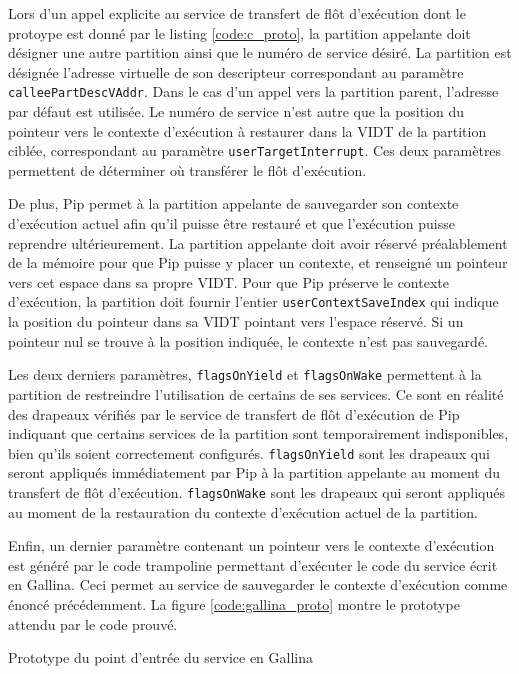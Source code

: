 	Lors d'un appel explicite au service de transfert de flôt d'exécution dont le protoype est donné par le listing \ref{code:c_proto}, la partition appelante doit désigner une autre partition ainsi que le numéro de service désiré. La partition est désignée l'adresse virtuelle de son descripteur correspondant au paramètre \texttt{calleePartDescVAddr}. Dans le cas d'un appel vers la partition parent, l'adresse par défaut est utilisée. Le numéro de service n'est autre que la position du pointeur vers le contexte d'exécution à restaurer dans la VIDT de la partition ciblée, correspondant au paramètre \texttt{userTargetInterrupt}. Ces deux paramètres permettent de déterminer où transférer le flôt d'exécution.

	De plus, Pip permet à la partition appelante de sauvegarder son contexte d'exécution actuel afin qu'il puisse être restauré et que l'exécution puisse reprendre ultérieurement. La partition appelante doit avoir réservé préalablement de la mémoire pour que Pip puisse y placer un contexte, et renseigné un pointeur vers cet espace dans sa propre VIDT. Pour que Pip préserve le contexte d'exécution, la partition doit fournir l'entier \texttt{userContextSaveIndex} qui indique la position du pointeur dans sa VIDT pointant vers l'espace réservé. Si un pointeur nul se trouve à la position indiquée, le contexte n'est pas sauvegardé.

	Les deux derniers paramètres, \texttt{flagsOnYield} et \texttt{flagsOnWake} permettent à la partition de restreindre l'utilisation de certains de ses services. Ce sont en réalité des drapeaux vérifiés par le service de transfert de flôt d'exécution de Pip indiquant que certains services de la partition sont temporairement indisponibles, bien qu'ils soient correctement configurés. \texttt{flagsOnYield} sont les drapeaux qui seront appliqués immédiatement par Pip à la partition appelante au moment du transfert de flôt d'exécution. \texttt{flagsOnWake} sont les drapeaux qui seront appliqués au moment de la restauration du contexte d'exécution actuel de la partition.

	Enfin, un dernier paramètre contenant un pointeur vers le contexte d'exécution est généré par le code trampoline permettant d'exécuter le code du service écrit en Gallina. Ceci permet au service de sauvegarder le contexte d'exécution comme énoncé précédemment. La figure \ref{code:gallina_proto} montre le prototype attendu par le code prouvé.

		\begin{listing}[!ht]
			\caption{Prototype du point d'entrée du service en Gallina}
			\label{code:gallina_proto}
		\end{listing}
		
